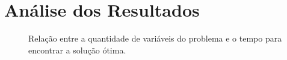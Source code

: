 \section{Análise dos Resultados}

    \begin{figure}[H]
        \centering
        \caption{Relação entre a quantidade de variáveis do problema e o tempo para encontrar a solução ótima.}

    \end{figure}
